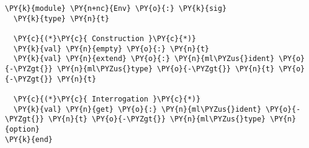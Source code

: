 \begin{Verbatim}[commandchars=\\\{\}]
\PY{k}{module} \PY{n+nc}{Env} \PY{o}{:} \PY{k}{sig}
  \PY{k}{type} \PY{n}{t}

  \PY{c}{(*}\PY{c}{ Construction }\PY{c}{*)}
  \PY{k}{val} \PY{n}{empty} \PY{o}{:} \PY{n}{t}
  \PY{k}{val} \PY{n}{extend} \PY{o}{:} \PY{n}{ml\PYZus{}ident} \PY{o}{-\PYZgt{}} \PY{n}{ml\PYZus{}type} \PY{o}{-\PYZgt{}} \PY{n}{t} \PY{o}{-\PYZgt{}} \PY{n}{t}

  \PY{c}{(*}\PY{c}{ Interrogation }\PY{c}{*)}
  \PY{k}{val} \PY{n}{get} \PY{o}{:} \PY{n}{ml\PYZus{}ident} \PY{o}{-\PYZgt{}} \PY{n}{t} \PY{o}{-\PYZgt{}} \PY{n}{ml\PYZus{}type} \PY{n}{option}
\PY{k}{end}
\end{Verbatim}
